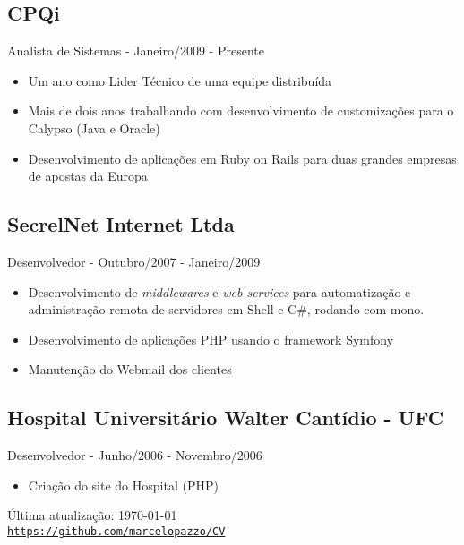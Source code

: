 \documentclass[letterpaper]{article}
\def\footerlink{https://github.com/marcelopazzo/CV}
\begin{document}
\subsection*{CPQi}
Analista de Sistemas - Janeiro/2009 - Presente
\begin{itemize}
\item Um ano como Lider Técnico de uma equipe distribuída
\item Mais de dois anos trabalhando com desenvolvimento de customizações para o Calypso (Java e Oracle)
\item Desenvolvimento de aplicações em Ruby on Rails para duas grandes empresas de apostas da Europa 
\end{itemize}

\subsection*{SecrelNet Internet Ltda}
 Desenvolvedor - Outubro/2007 - Janeiro/2009
\begin{itemize}
\item Desenvolvimento de \textit{middlewares} e \textit{web services} para automatização e administração remota de servidores em Shell e C\#, rodando com mono.
\item Desenvolvimento de aplicações PHP usando o framework Symfony
\item Manutenção do Webmail dos clientes
\end{itemize}

\subsection*{Hospital Universitário Walter Cantídio - UFC}
Desenvolvedor - Junho/2006 - Novembro/2006
\begin{itemize}
\item Criação do site do Hospital (PHP)
\end{itemize}

\bigskip

\begin{center}
  \begin{footnotesize}
    Última atualização: \today \\
    \href{\footerlink}{\texttt{\footerlink}}
  \end{footnotesize}
\end{center}
\end{document}
